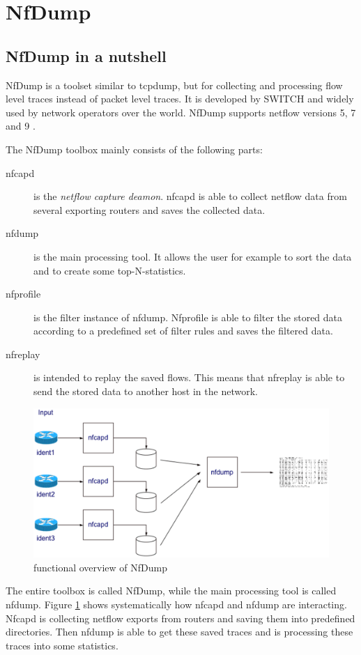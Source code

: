 \section{NfDump}

\subsection{NfDump in a nutshell}
NfDump is a toolset similar to tcpdump, but for collecting and processing flow level traces instead of packet level traces. It is developed by SWITCH and widely used by network operators over the world. NfDump supports netflow versions 5, 7 and 9 \cite{nfdump:SF}.

The NfDump toolbox mainly consists of the following parts:
\begin{description}
	\item[nfcapd] is the \emph{netflow capture deamon}. nfcapd is able to collect netflow data from several exporting routers and saves the collected data.
	\item[nfdump] is the main processing tool. It allows the user for example to sort the data and to create some top-N-statistics.
	\item[nfprofile] is the filter instance of nfdump. Nfprofile is able to filter the stored data according to a predefined set of filter rules and saves the filtered data.
	\item[nfreplay]	is intended to replay the saved flows. This means that nfreplay is able to send the stored data to another host in the network.
\end{description}
\begin{figure}[ht!]
	\centering
	\includegraphics[width=160mm]{images/nfdump}
	\caption{functional overview of NfDump \cite{nfdump:SF}}
	\label{fig:nfdump}
\end{figure}
The entire toolbox is called NfDump, while the main processing tool is called nfdump.
Figure \ref{fig:nfdump} shows systematically how nfcapd and nfdump are interacting. Nfcapd is collecting netflow exports from routers and saving them into predefined directories. Then nfdump is able to get these saved traces and is processing these traces into some statistics.


